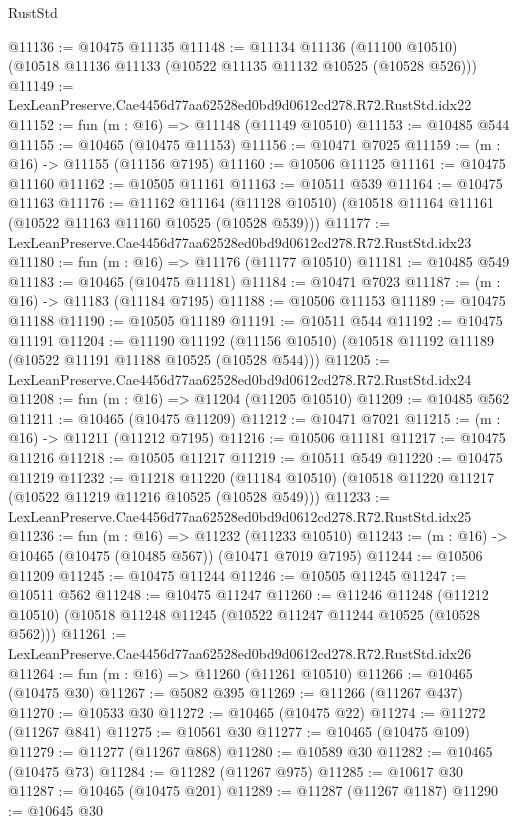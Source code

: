 \begin{lexlean}{RustStd}
\begin{coremodule}
@11136 := @10475 @11135
@11148 := @11134
    @11136
    (@11100 @10510)
    (@10518 @11136 @11133 (@10522 @11135 @11132 @10525 (@10528 @526)))
@11149 := LexLeanPreserve.Cae4456d77aa62528ed0bd9d0612cd278.R72.RustStd.idx22
@11152 := fun (m : @16) => @11148 (@11149 @10510)
@11153 := @10485 @544
@11155 := @10465 (@10475 @11153)
@11156 := @10471 @7025
@11159 := (m : @16) -> @11155 (@11156 @7195)
@11160 := @10506 @11125
@11161 := @10475 @11160
@11162 := @10505 @11161
@11163 := @10511 @539
@11164 := @10475 @11163
@11176 := @11162
    @11164
    (@11128 @10510)
    (@10518 @11164 @11161 (@10522 @11163 @11160 @10525 (@10528 @539)))
@11177 := LexLeanPreserve.Cae4456d77aa62528ed0bd9d0612cd278.R72.RustStd.idx23
@11180 := fun (m : @16) => @11176 (@11177 @10510)
@11181 := @10485 @549
@11183 := @10465 (@10475 @11181)
@11184 := @10471 @7023
@11187 := (m : @16) -> @11183 (@11184 @7195)
@11188 := @10506 @11153
@11189 := @10475 @11188
@11190 := @10505 @11189
@11191 := @10511 @544
@11192 := @10475 @11191
@11204 := @11190
    @11192
    (@11156 @10510)
    (@10518 @11192 @11189 (@10522 @11191 @11188 @10525 (@10528 @544)))
@11205 := LexLeanPreserve.Cae4456d77aa62528ed0bd9d0612cd278.R72.RustStd.idx24
@11208 := fun (m : @16) => @11204 (@11205 @10510)
@11209 := @10485 @562
@11211 := @10465 (@10475 @11209)
@11212 := @10471 @7021
@11215 := (m : @16) -> @11211 (@11212 @7195)
@11216 := @10506 @11181
@11217 := @10475 @11216
@11218 := @10505 @11217
@11219 := @10511 @549
@11220 := @10475 @11219
@11232 := @11218
    @11220
    (@11184 @10510)
    (@10518 @11220 @11217 (@10522 @11219 @11216 @10525 (@10528 @549)))
@11233 := LexLeanPreserve.Cae4456d77aa62528ed0bd9d0612cd278.R72.RustStd.idx25
@11236 := fun (m : @16) => @11232 (@11233 @10510)
@11243 := (m : @16) -> @10465 (@10475 (@10485 @567)) (@10471 @7019 @7195)
@11244 := @10506 @11209
@11245 := @10475 @11244
@11246 := @10505 @11245
@11247 := @10511 @562
@11248 := @10475 @11247
@11260 := @11246
    @11248
    (@11212 @10510)
    (@10518 @11248 @11245 (@10522 @11247 @11244 @10525 (@10528 @562)))
@11261 := LexLeanPreserve.Cae4456d77aa62528ed0bd9d0612cd278.R72.RustStd.idx26
@11264 := fun (m : @16) => @11260 (@11261 @10510)
@11266 := @10465 (@10475 @30)
@11267 := @5082 @395
@11269 := @11266 (@11267 @437)
@11270 := @10533 @30
@11272 := @10465 (@10475 @22)
@11274 := @11272 (@11267 @841)
@11275 := @10561 @30
@11277 := @10465 (@10475 @109)
@11279 := @11277 (@11267 @868)
@11280 := @10589 @30
@11282 := @10465 (@10475 @73)
@11284 := @11282 (@11267 @975)
@11285 := @10617 @30
@11287 := @10465 (@10475 @201)
@11289 := @11287 (@11267 @1187)
@11290 := @10645 @30

\end{coremodule}
\end{lexlean}
